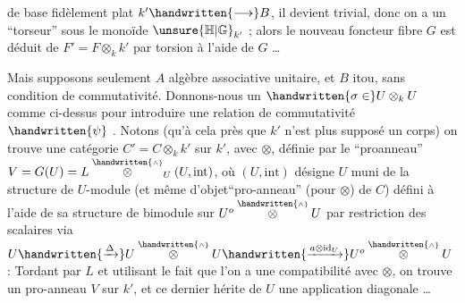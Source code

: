 de base fidèlement plat $k'\handwritten{\longrightarrow}B$,  il devient trivial, donc on a un ``torseur'' sous le monoïde $\unsure{\mathbb{H}|\mathbb{G}}_{k'}$ ; alors le nouveau foncteur fibre $G$ est déduit de $F'=F\otimes_k k'$ par torsion à l'aide de $G$ \ldots

Mais supposons seulement $A$ algèbre associative unitaire, et $B$ itou, sans condition de commutativité. Donnons-nous un $\handwritten{\sigma\in}U\otimes_k U$  comme ci-dessus pour introduire une relation de commutativité $\handwritten{\psi}$ . Notons (qu'à cela près que $k'$ n'est plus supposé un corps) on trouve une catégorie $C'=C\otimes_k k'$ sur $k'$, avec $\otimes$, définie par le ``proanneau'' $V=G(U)=L\overset{\handwritten{\scriptscriptstyle\wedge}}{\otimes}_U(U,\mathrm{int})$, où $(U,\mathrm{int})$ désigne $U$ muni de la structure de $U$-module  (et même d'objet``pro-anneau'' (pour $\otimes$) de $C$) défini à l'aide de sa structure de bimodule sur $U^o\overset{\handwritten{\scriptscriptstyle\wedge}}{\otimes} U$  par restriction des scalaires via $U\handwritten{\xrightarrow{\Delta}}U\overset{\handwritten{\scriptscriptstyle\wedge}}{\otimes} U\handwritten{\xrightarrow{a\otimes\mathrm{id}_U}}U^o\overset{\handwritten{\scriptscriptstyle\wedge}}{\otimes} U$ : Tordant par $L$ et utilisant le fait que l'on a une compatibilité avec $\otimes$, on trouve un pro-anneau $V$ sur $k'$, et ce dernier hérite de $U$ une application diagonale \ldots
{}
